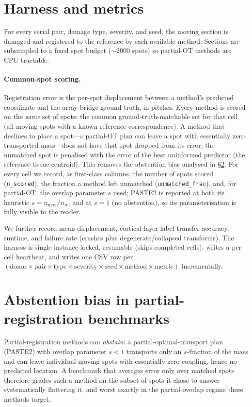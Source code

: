 \documentclass[11pt]{article}
\begin{document}
\section{Harness and metrics}
\label{sec:harness}
For every serial pair, damage type, severity, and seed, the moving section is
damaged and registered to the reference by each available method. Sections are
subsampled to a fixed spot budget ($\sim$2000 spots) so partial-OT methods are
CPU-tractable.

\paragraph{Common-spot scoring.} Registration error is the per-spot displacement
between a method's predicted coordinate and the array-bridge ground truth, in
pitches. Every method is scored on the \emph{same} set of spots: the common
ground-truth-matchable set for that cell (all moving spots with a known reference
correspondence). A method that declines to place a spot---a partial-OT plan can
leave a spot with essentially zero transported mass---does not have that spot
dropped from its error; the unmatched spot is penalised with the error of the
best uninformed predictor (the reference-tissue centroid). This removes the
abstention bias analysed in \S\ref{sec:abstention}. For every cell we record, as
first-class columns, the number of spots scored (\texttt{n\_scored}), the
fraction a method left unmatched (\texttt{unmatched\_frac}), and, for partial-OT,
the overlap parameter $s$ used; PASTE2 is reported at both its heuristic
$s{=}n_\text{mov}/n_\text{ref}$ and at $s{=}1$ (no abstention), so its
parameterisation is fully visible to the reader.

We further record mean displacement, cortical-layer label-transfer accuracy,
runtime, and failure rate (crashes plus degenerate/collapsed transforms). The
harness is single-instance-locked, resumable (skips completed cells), writes a
per-cell heartbeat, and writes one CSV row per
$(\text{donor}\times\text{pair}\times\text{type}\times\text{severity}\times
\text{seed}\times\text{method}\times\text{metric})$ incrementally.

\section{Abstention bias in partial-registration benchmarks}
\label{sec:abstention}
Partial-registration methods can \emph{abstain}: a partial-optimal-transport plan
(PASTE2) with overlap parameter $s<1$ transports only an $s$-fraction of the mass
and can leave individual moving spots with essentially zero coupling, hence no
predicted location. A benchmark that averages error only over matched spots
therefore grades such a method on the subset of spots it chose to answer---
systematically flattering it, and worst exactly in the partial-overlap regime
these methods target.
\end{document}
